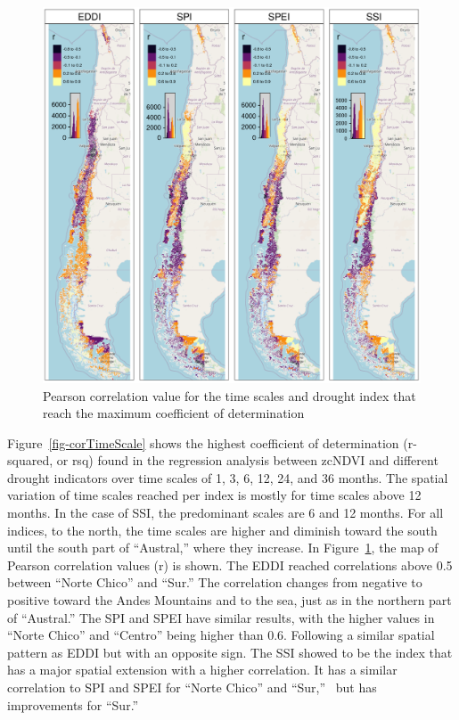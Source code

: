 \documentclass[
  authoryear,
  preprint,
  3p,
  onecolumn]{elsarticle}
\begin{document}
\begin{figure}[!ht]

{\centering \includegraphics{../output/figs/mapa_cor_r_indices_zcNDVI6.png}

}

\caption{\label{fig-corPerson}Pearson correlation value for the time
scales and drought index that reach the maximum coefficient of
determination}

\end{figure}

Figure~\ref{fig-corTimeScale} shows the highest coefficient of
determination (r-squared, or rsq) found in the regression analysis
between zcNDVI and different drought indicators over time scales of 1,
3, 6, 12, 24, and 36 months. The spatial variation of time scales
reached per index is mostly for time scales above 12 months. In the case
of SSI, the predominant scales are 6 and 12 months. For all indices, to
the north, the time scales are higher and diminish toward the south
until the south part of ``Austral,'' where they increase. In
Figure~\ref{fig-corPerson}, the map of Pearson correlation values (r) is
shown. The EDDI reached correlations above 0.5 between ``Norte Chico''
and ``Sur.'' The correlation changes from negative to positive toward
the Andes Mountains and to the sea, just as in the northern part of
``Austral.'' The SPI and SPEI have similar results, with the higher
values in ``Norte Chico'' and ``Centro'' being higher than 0.6.
Following a similar spatial pattern as EDDI but with an opposite sign.
The SSI showed to be the index that has a major spatial extension with a
higher correlation. It has a similar correlation to SPI and SPEI for
``Norte Chico'' and ``Sur,''~ but has improvements for ``Sur.''
\end{document}
